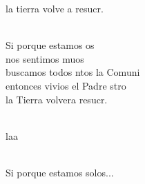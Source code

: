 \documentclass[12pt]{article}
\begin{document}
\begin{multicols*}{2}
\begin{cancion}
	la tierra volve a resucr.\\\jump\\
	\begin{chorus}%
	Si porque estamos os \\
	nos sentimos muos\\
	buscamos todos ntos la Comuni\\
	entonces vivios el Padre stro\\
	la Tierra volvera resucr.\\
	\end{chorus}%
	\jump\\
	laa    \\\jump\\
	\begin{chorus}%
Si porque estamos solos...\\
	\end{chorus}%
	\jump\\
\end{cancion}%


\end{multicols*}
\end{document}

